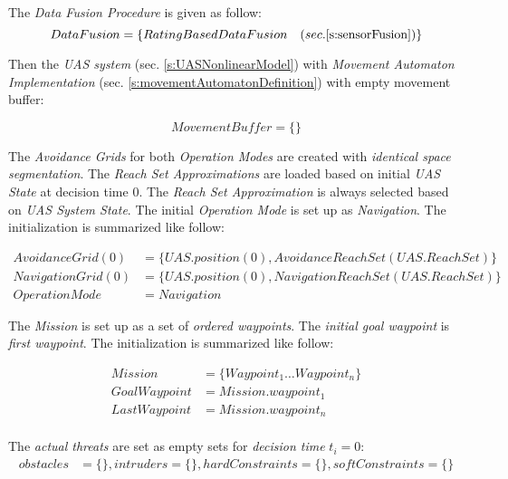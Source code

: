 The \emph{Data Fusion Procedure} is given as follow:
\begin{equation}
    DataFusion = \{Rating Based Data Fusion \quad (sec. \ref{s:sensorFusion})\}
\end{equation}

Then the \emph{UAS system} (sec. \ref{s:UASNonlinearModel}) with \emph{Movement Automaton Implementation} (sec. \ref{s:movementAutomatonDefinition}) with empty movement buffer:

\begin{equation}
    Movement Buffer = \{\}
\end{equation}

The \emph{Avoidance Grids} for both \emph{Operation Modes} are created with \emph{identical space segmentation}. The \emph{Reach Set Approximations} are loaded based on initial \emph{UAS State} at decision time $0$. The \emph{Reach Set Approximation} is always selected based on \emph{UAS System State}. The initial \emph{Operation Mode} is set up as \emph{Navigation}. The initialization is summarized like follow:

\begin{equation}
    \begin{aligned}
    Avoidance Grid(0) &= \{UAS.position(0),AvoidanceReachSet(UAS.ReachSet)\}\\
    Navigation Grid (0) &= \{UAS.position(0), NavigationReachSet(UAS.ReachSet)\}\\
    Operation Mode &= Navigation
    \end{aligned}
\end{equation}

The \emph{Mission} is set up as a set of \emph{ordered waypoints}. The \emph{initial goal waypoint} is \emph{first waypoint}. The initialization is summarized like follow:

\begin{equation}
    \begin{aligned}
    Mission &= \{Waypoint_1 \dots  Waypoint_n\}\\
    Goal Waypoint &= Mission.waypoint_1\\
    Last Waypoint &= Mission.waypoint_n\\
    \end{aligned}
\end{equation}

The \emph{actual threats} are set as empty sets for \emph{decision time} $t_i=0$:
\begin{equation}
    \begin{aligned}
    obstacles &= \{\}, intruders = \{\}, hard Constraints = \{\}, soft Constraints = \{\}\\
    \end{aligned}
\end{equation}




